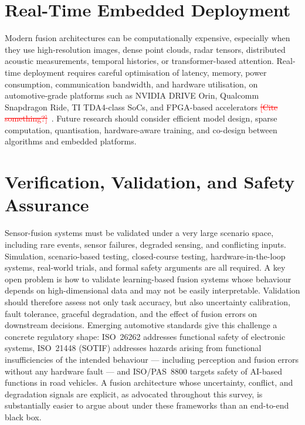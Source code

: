 \documentclass[11pt,oneside,openany]{book}
\newcommand{\deleted}[1]{\textcolor{red}{\sout{#1}}}
\newcommand{\addednew}[1]{\textcolor{RevisionOlive}{#1}}
\begin{document}
\section{Real-Time Embedded Deployment}

Modern fusion architectures can be computationally expensive, especially when they use high-resolution images, dense point clouds, radar tensors, distributed acoustic measurements, temporal histories, or transformer-based attention. Real-time deployment requires careful optimisation of latency, memory, power consumption, communication bandwidth, and hardware utilisation, on automotive-grade platforms such as NVIDIA DRIVE Orin, Qualcomm Snapdragon Ride, TI TDA4-class SoCs, and FPGA-based accelerators\deleted{ [Cite something?]}\addednew{~\cite{lin2018_architectural,liu2019_edge_computing,sze2017_efficient}}. Future research should consider efficient model design, sparse computation, quantisation, hardware-aware training, and co-design between algorithms and embedded platforms.

\section{Verification, Validation, and Safety Assurance}

Sensor-fusion systems must be validated under a very large scenario space, including rare events, sensor failures, degraded sensing, and conflicting inputs. Simulation, scenario-based testing, closed-course testing, hardware-in-the-loop systems, real-world trials, and formal safety arguments are all required. A key open problem is how to validate learning-based fusion systems whose behaviour depends on high-dimensional data and may not be easily interpretable. Validation should therefore assess not only task accuracy, but also uncertainty calibration, fault tolerance, graceful degradation, and the effect of fusion errors on downstream decisions. \addednew{Emerging automotive standards give this challenge a concrete regulatory shape: ISO~26262 addresses functional safety of electronic systems, ISO~21448 (SOTIF) addresses hazards arising from functional insufficiencies of the intended behaviour --- including perception and fusion errors without any hardware fault --- and ISO/PAS~8800 targets safety of AI-based functions in road vehicles. A fusion architecture whose uncertainty, conflict, and degradation signals are explicit, as advocated throughout this survey, is substantially easier to argue about under these frameworks than an end-to-end black box.} %
\end{document}
